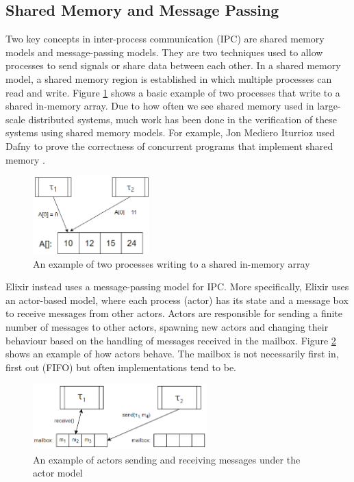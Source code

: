 \subsection{Shared Memory and Message Passing}
Two key concepts in inter-process communication (IPC) are shared memory models and message-passing models. They are two techniques used to allow processes to send signals or share data between each other. In a shared memory model, a shared memory region is established in which multiple processes can read and write. Figure \ref{fig:shared_memory} shows a basic example of two processes that write to a shared in-memory array. Due to how often we see shared memory used in large-scale distributed systems, much work has been done in the verification of these systems using shared memory models. For example, Jon Mediero Iturrioz used Dafny \cite{dafny} to prove the correctness of concurrent programs that implement shared memory \cite{shared_memory_verification}. 
\begin{figure}[h]
    \centering
    \includegraphics[width=0.4\textwidth]{images/shared_memory.png}
    \caption{An example of two processes writing to a shared in-memory array}
    \label{fig:shared_memory}
\end{figure}
\par
Elixir instead uses a message-passing model for IPC. More specifically, Elixir uses an actor-based model, where each process (actor) has its state and a message box to receive messages from other actors. Actors are responsible for sending a finite number of messages to other actors, spawning new actors and changing their behaviour based on the handling of messages received in the mailbox. Figure \ref{fig:actor_model} shows an example of how actors behave. The mailbox is not necessarily first in, first out (FIFO) but often implementations tend to be.
\begin{figure}[H]
    \centering
    \includegraphics[width=0.6\textwidth]{images/actor_model.png}
    \caption{An example of actors sending and receiving messages under the actor model}
    \label{fig:actor_model}
\end{figure}
